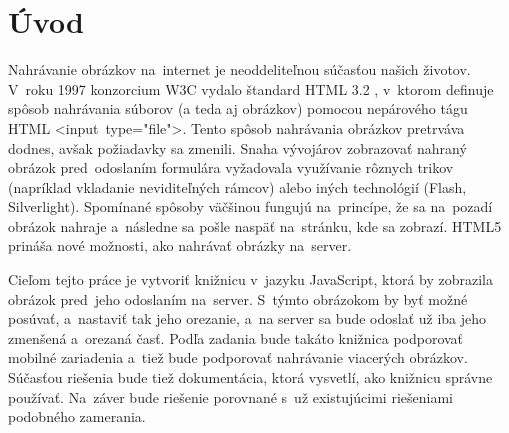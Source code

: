 \chapter{Úvod}

Nahrávanie obrázkov na~internet je neoddeliteľnou súčasťou našich životov. V~roku 1997 konzorcium W3C vydalo štandard HTML 3.2 \cite{html32}, v~ktorom definuje spôsob nahrávania súborov (a teda aj obrázkov) pomocou nepárového tágu HTML \hbox{<input type="file"\textgreater}. Tento spôsob nahrávania obrázkov pretrváva dodnes, avšak požiadavky sa zmenili. Snaha vývojárov zobrazovať nahraný obrázok pred~odoslaním formulára vyžadovala využívanie rôznych trikov (napríklad vkladanie neviditeľných rámcov) alebo iných technológií (Flash, Silverlight). Spomínané spôsoby väčšinou fungujú na~princípe, že sa na~pozadí obrázok nahraje a~následne sa pošle naspäť na~stránku, kde sa zobrazí. HTML5 prináša nové možnosti, ako nahrávať obrázky na~server.

Cieľom tejto práce je vytvoriť knižnicu v~jazyku JavaScript, ktorá by zobrazila obrázok pred~jeho odoslaním na~server. S~týmto obrázokom by byť možné posúvať, a~nastaviť tak jeho orezanie, a~na server sa bude odoslať už iba jeho zmenšená a~orezaná časť. Podľa zadania bude takáto knižnica podporovať mobilné zariadenia a~tiež bude podporovať nahrávanie viacerých obrázkov. Súčasťou riešenia bude tiež dokumentácia, ktorá vysvetlí, ako knižnicu správne používať. Na~záver bude riešenie porovnané s~už existujúcimi riešeniami podobného zamerania.